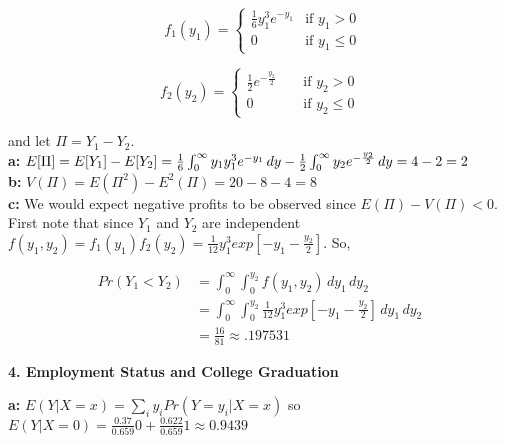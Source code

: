 \documentclass[11pt]{article}
\begin{document}
\begin{equation*}
\ \  f_{1}(y_{1}) =
    \begin{cases}
         \frac{1}{6} y_{1}^{3}e^{-y_{1}} & \text{if } y_{1} > 0 \\
         0 & \text{if } y_{1} \leq 0
    \end{cases}
\end{equation*}

\begin{equation*}
f_{2}(y_{2}) =
    \begin{cases}
         \frac{1}{2} e^{- \frac{y_{2}}{2}} & \ \ \ \ \ \text{if } y_{2} > 0 \\
         0 & \ \ \ \ \ \text{if } y_{2} \leq 0
    \end{cases}
\end{equation*}

and let $\Pi = Y_{1} - Y_{2}$.\\

\textbf{a:} $E[\Pi] = E[Y_{1}] - E[Y_{2}] = \frac{1}{6} \int_{0}^{\infty} y_{1} y_{1}^{3} e^{-y_{1}} \, dy - \frac{1}{2} \int_0^\infty y_{2} e^{- \frac{y_{2}}{2}} \, dy\\ = 4 - 2 = 2$\\

\textbf{b:} $V(\Pi) = E(\Pi^{2}) - E^{2}(\Pi) = 20 - 8 - 4 = 8$\\

\textbf{c:} We would expect negative profits to be observed since $E(\Pi) - V(\Pi) < 0$.\\
First note that since $Y_{1}$ and $Y_{2}$ are independent $f(y_{1}, y_{2}) = f_{1}(y_{1})f_{2}(y_{2}) = \frac{1}{12}y_{1}^{3}exp[-y_{1} - \frac{y_{2}}{2}]$. So,

\begin{align*}
    Pr(Y_{1} < Y_{2}) &= \int_0^\infty \int_0^{y_{2}} f(y_{1}, y_{2}) \, dy_{1} \, dy_{2}\\
    &= \int_0^\infty \int_0^{y_{2}} \frac{1}{12}y_{1}^{3}exp[-y_{1} - \frac{y_{2}}{2}] \, dy_{1} \, dy_{2}\\
    &= \frac{16}{81} \approx .197531
\end{align*}

\textbf{4. Employment Status and College Graduation}

\textbf{a:} $E(Y|X = x) = \sum_{i} y_{i} Pr(Y = y_{i}|X = x)$ so\\

$E(Y|X = 0) = \frac{0.37}{0.659} 0 + \frac{0.622}{0.659} 1 \approx 0.9439$\\
\end{document}
